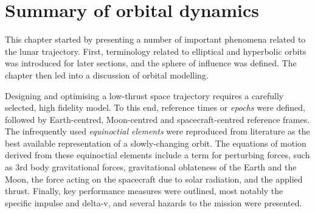 \section{Summary of orbital dynamics} 

This chapter started by presenting a number of important phenomena related to the lunar trajectory. First, terminology related to elliptical and hyperbolic orbits was introduced for later sections, and the sphere of influence was defined. The chapter then led into a discussion of orbital modelling.

Designing and optimising a low-thrust space trajectory requires a carefully selected, high fidelity model. To this end, reference times or \emph{epochs} were defined, followed by Earth-centred, Moon-centred and spacecraft-centred reference frames. The infrequently used \emph{equinoctial elements} were reproduced from literature as the best available representation of a slowly-changing orbit. The equations of motion derived from these equinoctial elements include a term for perturbing forces, such as 3rd body gravitational forces, gravitational oblateness of the Earth and the Moon, the force acting on the spacecraft due to solar radiation, and the applied thrust. Finally, key performance measures were outlined, most notably the specific impulse and delta-v, and several hazards to the mission were presented.